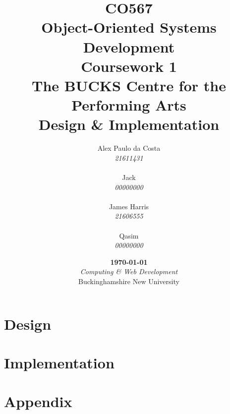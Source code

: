 \documentclass{report}
\title{
    \fontspec[Path=.fonts/]{LibertineDisplay}
    \Large CO567\\
    Object-Oriented Systems Development\\
    Coursework 1\vspace*{.65cm}\\
    \huge The BUCKS Centre for the Performing Arts\\
    Design \& Implementation\vfill
}
\author{
    Alex Paulo da Costa\\
    \textit{21611431}\\
    \hfill\\
    Jack\\
    \textit{00000000}\\
    \hfill\\
    James Harris\\
    \textit{21606555}\\
    \hfill\\
    Qasim\\
    \textit{00000000}
}
\date{
    \vfill\textbf{\today}\\
    \vspace*{.75cm}\textit{Computing \& Web Development}\\
    Buckinghamshire New University
}
\begin{document}
    \maketitle
    \tableofcontents

    \part{Design}
    
    
    
    

    \part{Implementation}
    
    
    
    
    

    \part{Appendix}
    
\end{document}
